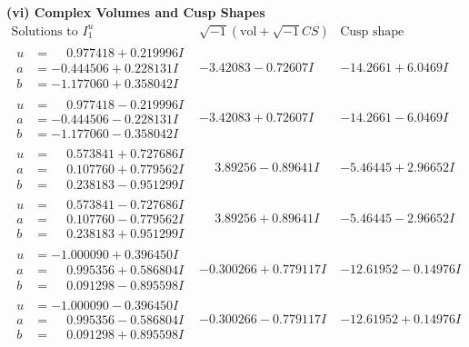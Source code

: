 \documentclass[1p]{elsarticle_modified}
\theoremstyle{definition}
\newcommand{\I}{\sqrt{-1}}
\begin{document}
\newpage\flushleft \textbf{(vi) Complex Volumes and Cusp Shapes}
$$\begin{array}{c|c|c}  
\text{Solutions to }I^u_{1}& \I (\text{vol} + \sqrt{-1}CS) & \text{Cusp shape}\\
 \hline 
\begin{aligned}
u &= \phantom{-}0.977418 + 0.219996 I \\
a &= -0.444506 + 0.228131 I \\
b &= -1.177060 + 0.358042 I\end{aligned}
 & -3.42083 - 0.72607 I & -14.2661 + 6.0469 I \\ \hline\begin{aligned}
u &= \phantom{-}0.977418 - 0.219996 I \\
a &= -0.444506 - 0.228131 I \\
b &= -1.177060 - 0.358042 I\end{aligned}
 & -3.42083 + 0.72607 I & -14.2661 - 6.0469 I \\ \hline\begin{aligned}
u &= \phantom{-}0.573841 + 0.727686 I \\
a &= \phantom{-}0.107760 + 0.779562 I \\
b &= \phantom{-}0.238183 - 0.951299 I\end{aligned}
 & \phantom{-}3.89256 - 0.89641 I & -5.46445 + 2.96652 I \\ \hline\begin{aligned}
u &= \phantom{-}0.573841 - 0.727686 I \\
a &= \phantom{-}0.107760 - 0.779562 I \\
b &= \phantom{-}0.238183 + 0.951299 I\end{aligned}
 & \phantom{-}3.89256 + 0.89641 I & -5.46445 - 2.96652 I \\ \hline\begin{aligned}
u &= -1.000090 + 0.396450 I \\
a &= \phantom{-}0.995356 + 0.586804 I \\
b &= \phantom{-}0.091298 - 0.895598 I\end{aligned}
 & -0.300266 + 0.779117 I & -12.61952 - 0.14976 I \\ \hline\begin{aligned}
u &= -1.000090 - 0.396450 I \\
a &= \phantom{-}0.995356 - 0.586804 I \\
b &= \phantom{-}0.091298 + 0.895598 I\end{aligned}
 & -0.300266 - 0.779117 I & -12.61952 + 0.14976 I \\ \hline\begin{aligned}

\end{aligned}
\end{array}$$
\end{document}
